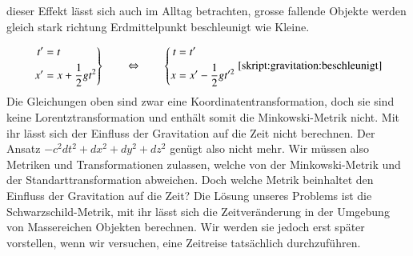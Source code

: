 \begin{refsection}
	dieser Effekt lässt sich auch im Alltag betrachten, grosse fallende Objekte werden gleich stark richtung Erdmittelpunkt beschleunigt wie Kleine.
	
	\begin{equation}
	\left.
	\begin{aligned}
	t'&=t\\
	x'&=x+\frac12gt^2
	\end{aligned}
	\right\}
	\qquad
	\Leftrightarrow
	\qquad
	\left\{
	\begin{aligned}
	t&=t'\\
	x&=x'-\frac12gt'^2
	\end{aligned}
	\right.
	\eqref{skript:gravitation:beschleunigt}
	\end{equation}
	Die Gleichungen oben sind zwar eine Koordinatentransformation, doch sie sind keine Lorentztransformation und enthält somit die Minkowski-Metrik nicht. Mit ihr lässt sich der Einfluss der Gravitation auf die Zeit nicht berechnen. 
	Der Ansatz $ -c^2dt^2 + dx^2 + dy^2 + dz^2$ genügt also nicht mehr. Wir müssen also Metriken und Transformationen zulassen, welche von der Minkowski-Metrik und der Standarttransformation abweichen.
	Doch welche Metrik beinhaltet den Einfluss der Gravitation auf die Zeit? 
	Die Lösung unseres Problems ist die Schwarzschild-Metrik, mit ihr lässt sich die Zeitveränderung in der Umgebung von Massereichen Objekten berechnen. Wir werden sie jedoch erst später vorstellen, wenn wir versuchen, eine Zeitreise tatsächlich durchzuführen. %

\end{refsection}
